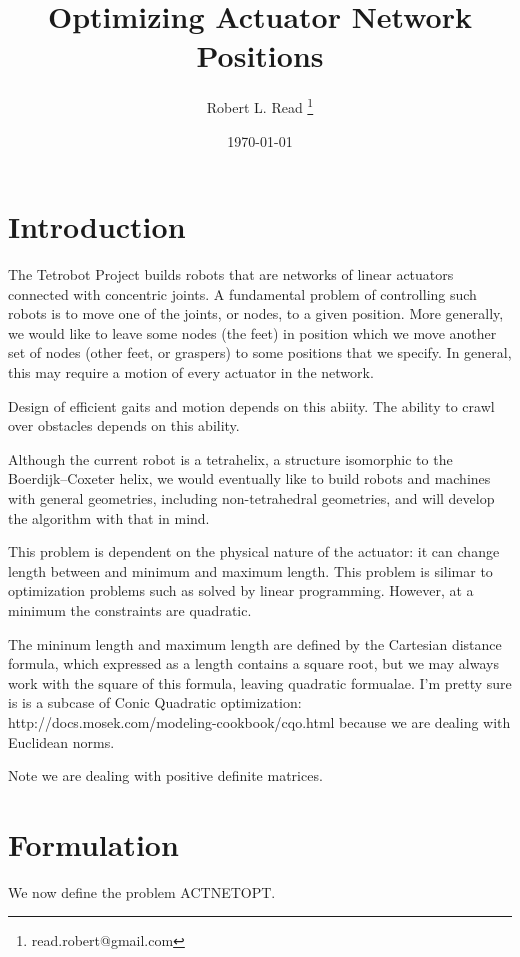 \documentclass[11pt]{article}
\title{Optimizing Actuator Network Positions}
\author{Robert L. Read
  \thanks{read.robert@gmail.com}
}
\affil{Founder, Public Invention, an educational non-profit.}
\date{\today}
\begin{document}
\maketitle


\section{Introduction}

The Tetrobot Project builds robots that are networks of linear actuators connected with concentric joints.
A fundamental problem of controlling such robots is to move one of the joints, or nodes, to a given
position.
More generally, we would like to leave some nodes (the feet) in position which we move another
set of nodes (other feet, or graspers) to some positions that we specify. In general, this may
require a motion of every actuator in the network.

Design of efficient gaits and motion depends on this abiity. The ability to crawl over obstacles
depends on this ability.

Although the current robot is a tetrahelix, a structure isomorphic to the Boerdijk--Coxeter
helix, we would eventually like to build robots and machines with general geometries,
including non-tetrahedral geometries, and will develop the algorithm with that in mind.

This problem is dependent on the physical nature of the actuator: it can change length
between and minimum and maximum length.
This problem is silimar to optimization problems such as solved by linear programming.
However, at a minimum the constraints are quadratic.


The mininum length and maximum length are defined by the Cartesian distance formula,
which expressed as a length contains a square root, but we may always work with the
square of this formula, leaving quadratic formualae.  I'm pretty sure is
is a subcase of Conic Quadratic optimization: http://docs.mosek.com/modeling-cookbook/cqo.html
because we are dealing with Euclidean norms.

Note we are dealing with positive definite matrices.


\section{Formulation}

We now define the problem ACTNETOPT.
\end{document}
